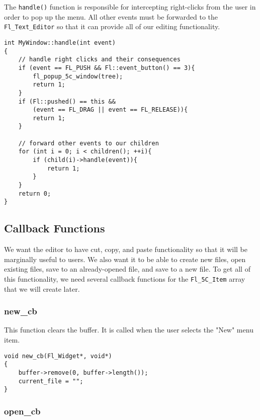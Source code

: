 The \texttt{handle()} function is responsible for intercepting right-clicks
from the user in order to pop up the \fc{} menu.  All other events must be
forwarded to the \texttt{Fl\_Text\_Editor} so that it can provide all of our
editing functionality.

\begin{samepage}
\begin{verbatim}
int MyWindow::handle(int event)
{
    // handle right clicks and their consequences
    if (event == FL_PUSH && Fl::event_button() == 3){
        fl_popup_5c_window(tree);
        return 1;
    }
    if (Fl::pushed() == this &&
        (event == FL_DRAG || event == FL_RELEASE)){
        return 1;
    }

    // forward other events to our children
    for (int i = 0; i < children(); ++i){
        if (child(i)->handle(event)){
            return 1;
        }
    }
    return 0;
}
\end{verbatim}
\end{samepage}

\subsection{Callback Functions}

We want the editor to have cut, copy, and paste functionality so that it will
be marginally useful to users.  We also want it to be able to create new
files, open existing files, save to an already-opened file, and save to a new
file.  To get all of this functionality, we need several callback functions
for the \texttt{Fl\_5C\_Item} array that we will create later.

\subsubsection{new\_cb}

This function clears the buffer.  It is called when the user selects the "New"
menu item.

\begin{samepage}
\begin{verbatim}
void new_cb(Fl_Widget*, void*)
{
    buffer->remove(0, buffer->length());
    current_file = "";
}
\end{verbatim}
\end{samepage}

\subsubsection{open\_cb}

